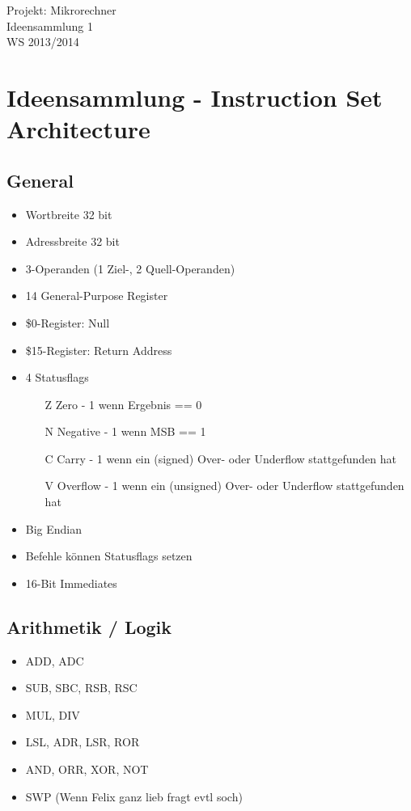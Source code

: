 \documentclass[a4paper]{article}
\newcommand{\titelblock}{
\sloppy
\begin{center}
\sffamily
{\Large{\veranstaltung \\}}
{\Huge{\doctitle  \nummer}\\}
\vspace{0.5cm}
\tutorium \\
\hrulefill
\end{center}
}
\newcommand{\doctitle}{Ideensammlung}
\newcommand{\nummer}{ 1} %
\newcommand{\tutorium}{WS 2013/2014}
\newcommand{\veranstaltung}{Projekt: Mikrorechner}
\begin{document}
\titelblock

\section{Ideensammlung - Instruction Set Architecture}

\subsection{General}

\begin{multicols}{2}
\begin{itemize}
  \item Wortbreite 32 bit
  \item Adressbreite 32 bit
  \item 3-Operanden (1 Ziel-, 2 Quell-Operanden)
  \item 14 General-Purpose Register
  \item \$0-Register: Null
  \item \$15-Register: Return Address
  \item 4 Statusflags
  \begin{itemize}
    \item[Z] Zero - 1 wenn Ergebnis == 0
    \item[N] Negative - 1 wenn MSB == 1
    \item[C] Carry - 1 wenn ein (signed) Over- oder Underflow stattgefunden hat
    \item[V] Overflow - 1 wenn ein (unsigned) Over- oder Underflow stattgefunden hat
  \end{itemize}
  \item Big Endian
  \item Befehle können Statusflags setzen
  \item 16-Bit Immediates
\end{itemize}

\subsection{Arithmetik / Logik}

\begin{itemize}
\item ADD, ADC
\item SUB, SBC, RSB, RSC
\item MUL, DIV
\item LSL, ADR, LSR, ROR 
\item AND, ORR, XOR, NOT
\item SWP (Wenn Felix ganz lieb fragt evtl soch)
\end{itemize}


\end{multicols}
\end{document}
